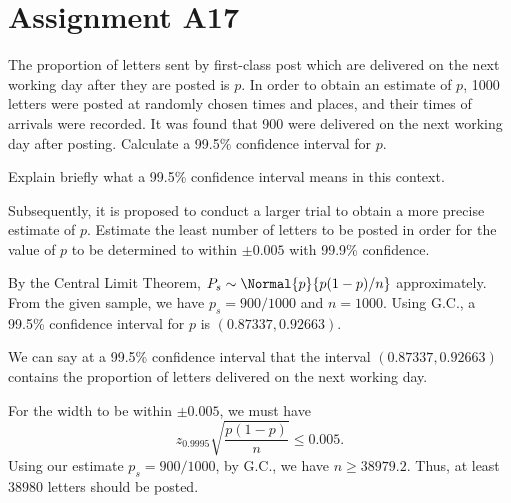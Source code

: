 \section{Assignment A17}

\begin{problem}
    The proportion of letters sent by first-class post which are delivered on the next working day after they are posted is $p$. In order to obtain an estimate of $p$, 1000 letters were posted at randomly chosen times and places, and their times of arrivals were recorded. It was found that 900 were delivered on the next working day after posting. Calculate a 99.5\% confidence interval for $p$.

    Explain briefly what a 99.5\% confidence interval means in this context.

    Subsequently, it is proposed to conduct a larger trial to obtain a more precise estimate of $p$. Estimate the least number of letters to be posted in order for the value of $p$ to be determined to within $\pm 0.005$ with 99.9\% confidence.
\end{problem}
\begin{solution}
    By the Central Limit Theorem, $P_s \sim \Normal{p}{p(1-p)/n}$ approximately. From the given sample, we have $p_s = 900/1000$ and $n = 1000$. Using G.C., a 99.5\% confidence interval for $p$ is $(0.87337, 0.92663)$.

    We can say at a 99.5\% confidence interval that the interval $(0.87337, 0.92663)$ contains the proportion of letters delivered on the next working day.

    For the width to be within $\pm 0.005$, we must have \[z_{0.9995} \sqrt{\frac{p(1-p)}{n}} \leq 0.005.\] Using our estimate $p_s = 900/1000$, by G.C., we have $n \geq 38979.2$. Thus, at least 38980 letters should be posted.
\end{solution}

